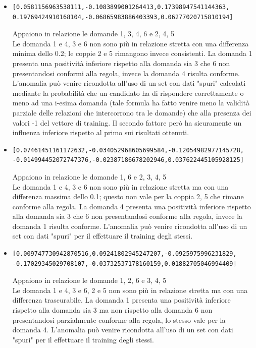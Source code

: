 \documentclass[11pt,a4paper,italian]{article}
\begin{document}
\begin{itemize}
\item  \begin{verbatim}[0.0581156963538111,-0.1083899001264413,0.17398947541144363,
0.19769424910168104,-0.06865983886403393,0.06277020715810194]\end{verbatim}
Appaiono in relazione le domande 1, 3, 4, 6 e 2, 4, 5\\
Le domanda 1 e 4, 3 e 6  non sono pi\`u in relazione stretta con una differenza minima dello 0.2; le coppie 2 e 5 rimangono invece consistenti. La domanda 1 presenta una positivit\`a inferiore rispetto alla domanda sia 3 che 6 non presentandosi conformi alla regola, invece la domanda 4 risulta conforme. L'anomalia pu\`o venire ricondotta all'uso di un set con dati "spuri" calcolati mediante la probabilit\`a che un candidato ha di rispondere correttamente o meno ad una i-esima domanda (tale formula ha fatto venire meno la validit\`a parziale delle relazioni che intercorrono tra le domande) che alla presenza dei valori -1 del vettore di training. Il secondo fattore per\`o ha sicuramente un influenza inferiore rispetto al primo sui risultati ottenuti.

\item  \begin{verbatim}[0.07461451161172632,-0.034052968605699584,-0.12054982977145728,
-0.014994452072747376,-0.02387186678202946,0.037622445105928125]\end{verbatim}
Appaiono in relazione le domande 1, 6 e 2, 3, 4, 5\\
Le domanda 1 e 4, 3 e 6 non sono pi\`u in relazione stretta ma con una differenza massima dello 0.1; questo non vale per la coppia 2, 5 che rimane conforme alla regola. La domanda 4 presenta una positivit\`a inferiore rispetto alla domanda sia 3 che 6 non presentandosi conforme alla regola, invece la domanda 1 risulta conforme. L'anomalia pu\`o venire ricondotta all'uso di un set con dati "spuri" per il effettuare il training degli stessi.

\item  \begin{verbatim}[0.009747730942870516,0.09241802945247207,-0.0925975996231829,
-0.17029345029708107,-0.03732537178160159,0.01882705046994409]\end{verbatim}
Appaiono in relazione le domande 1, 2, 6 e 3, 4, 5\\
Le domanda 1 e 4, 3 e 6, 2 e 5  non sono pi\`u in relazione stretta ma con una differenza trascurabile. La domanda 1 presenta una positivit\`a inferiore rispetto alla domanda sia 3 ma non rispetto alla domanda 6 non presentandosi parzialmente conforme alla regola, lo stesso vale per la domanda 4. L'anomalia pu\`o venire ricondotta all'uso di un set con dati "spuri" per il effettuare il training degli stessi.


\end{itemize}
\end{document}
